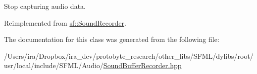 Stop capturing audio data. 



Reimplemented from \hyperlink{classsf_1_1_sound_recorder_aefc36138ca1e96c658301280e4a31b64}{sf\-::\-Sound\-Recorder}.



The documentation for this class was generated from the following file\-:\begin{DoxyCompactItemize}
\item 
/\-Users/ira/\-Dropbox/ira\-\_\-dev/protobyte\-\_\-research/other\-\_\-libs/\-S\-F\-M\-L/dylibs/root/usr/local/include/\-S\-F\-M\-L/\-Audio/\hyperlink{_sound_buffer_recorder_8hpp}{Sound\-Buffer\-Recorder.\-hpp}\end{DoxyCompactItemize}
